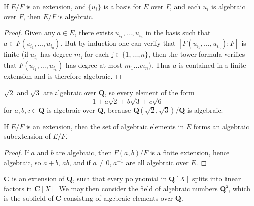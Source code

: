 \begin{theorem}
    If $E/F$ is an extension, and $\{ u_i \}$ is a basis for $E$ over $F$, and each $u_i$ is algebraic over $F$, then $E/F$ is algebraic.
\end{theorem}
\begin{proof}
	Given any $a \in E$, there exists $u_{i_1}, \dots, u_{i_n}$ in the basis such that $a \in F(u_{i_1},\dots,u_{i_n})$. But by induction one can verify that $[F(u_{i_1},\dots,u_{i_n}): F]$ is finite (if $u_{i_j}$ has degree $m_j$ for each $j \in \{ 1, \dots, n \}$, then the tower formula verifies that $F(u_{i_1},\dots,u_{i_n})$ has degree at most $m_1 \dots m_n$). Thus $a$ is contained in a finite extension and is therefore algebraic.
\end{proof}

\begin{example}
    $\sqrt{2}$ and $\sqrt{3}$ are algebraic over $\mathbf{Q}$, so every element of the form
    \[ 1 + a \sqrt{2} + b \sqrt{3} + c \sqrt{6} \]
    for $a,b,c \in \mathbf{Q}$ is algebraic over $\mathbf{Q}$, because $\mathbf{Q}(\sqrt{2},\sqrt{3})/\mathbf{Q}$ is algebraic.
\end{example}

\begin{theorem}
    If $E/F$ is an extension, then the set of algebraic elements in $E$ forms an algebraic subextension of $E/F$.
\end{theorem}
\begin{proof}
    If $a$ and $b$ are algebraic, then $F(a,b)/F$ is a finite extension, hence algebraic, so $a + b$, $ab$, and if $a \neq 0$, $a^{-1}$ are all algebraic over $E$.
\end{proof}

\begin{example}
    $\mathbf{C}$ is an extension of $\mathbf{Q}$, such that every polynomial in $\mathbf{Q}[X]$ splits into linear factors in $\mathbf{C}[X]$. We may then consider the field of algebraic numbers $\mathbf{Q}^{\mathfrak{a}}$, which is the subfield of $\mathbf{C}$ consisting of algebraic elements over $\mathbf{Q}$.
\end{example}

